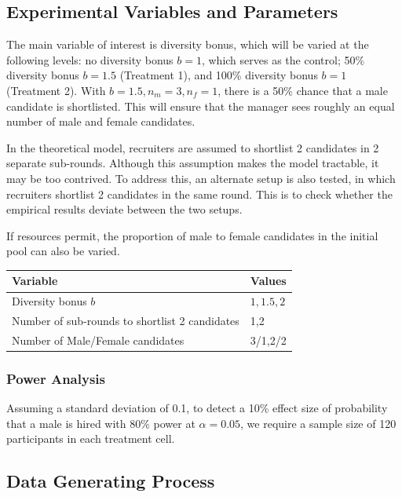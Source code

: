\documentclass[11pt]{article}
\begin{document}
\subsection{Experimental Variables and Parameters}

The main variable of interest is diversity bonus, which will be varied at the following levels: no diversity bonus $b=1$, which serves as the control; 50\% diversity bonus $b=1.5$ (Treatment 1), and 100\% diversity bonus $b=1$ (Treatment 2). With $b=1.5, n_m=3, n_f=1$, there is a 50\% chance that a male candidate is shortlisted. This will ensure that the manager sees roughly an equal number of male and female candidates.

In the theoretical model, recruiters are assumed to shortlist 2 candidates in 2 separate sub-rounds. Although this assumption makes the model tractable, it may be too contrived. To address this, an alternate setup is also tested, in which recruiters shortlist 2 candidates in the same round. This is to check whether the empirical results deviate between the two setups.

If resources permit, the proportion of male to female candidates in the initial pool can also be varied.

\begin{center}
    \begin{tabular}{ l l}
        \hline
        Variable                                       & Values    \\
        \hline
        Diversity bonus $b$                            & $1,1.5,2$ \\
        Number of sub-rounds to shortlist 2 candidates & 1,2       \\
        Number of Male/Female candidates               & 3/1,2/2
    \end{tabular}
\end{center}


\subsubsection*{Power Analysis}
Assuming a standard deviation of 0.1, to detect a 10\% effect size of probability that a male is hired with 80\% power at $\alpha=0.05$, we require a sample size of 120 participants in each treatment cell.

\subsection{Data Generating Process}
\end{document}
